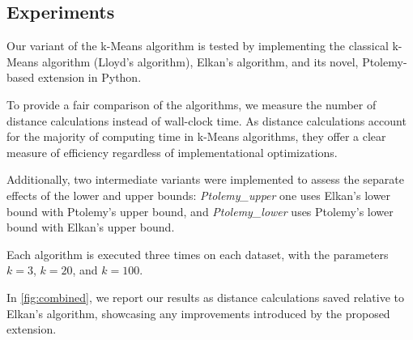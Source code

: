 \subsection{Experiments}
Our variant of the k-Means algorithm is tested by implementing the classical k-Means algorithm (Lloyd's algorithm), Elkan's algorithm, and its novel, Ptolemy-based extension in Python.

To provide a fair comparison of the algorithms,
we measure the number of distance calculations instead of wall-clock time.
As distance calculations account for the majority of computing time in k-Means algorithms, they offer a clear measure of efficiency regardless of implementational optimizations.

Additionally, two intermediate variants were implemented to assess the separate effects of the lower and upper bounds:
\emph{Ptolemy\_upper} one uses Elkan's lower bound with Ptolemy's upper bound, and \emph{Ptolemy\_lower} uses Ptolemy's lower bound with Elkan's upper bound.

Each algorithm is executed three times on each dataset, with the parameters $k = 3$, $k = 20$, and $k = 100$.

In \autoref{fig:combined}, we report our results as distance calculations saved relative to Elkan's algorithm, showcasing any improvements introduced by the proposed extension.


